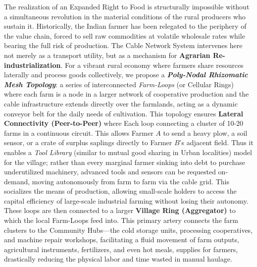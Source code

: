 The realization of an Expanded Right to Food is structurally impossible
without a simultaneous revolution in the material conditions of the
rural producers who sustain it. Historically, the Indian farmer has been
relegated to the periphery of the value chain, forced to sell raw
commodities at volatile wholesale rates while bearing the full risk of
production. The Cable Network System intervenes here not merely as a
transport utility, but as a mechanism for \textbf{Agrarian
Re-industrialization}. For a vibrant rural economy where farmers share
resources laterally and process goods collectively, we propose a
\textbf{\emph{Poly-Nodal Rhizomatic Mesh Topology}}: a series of
interconnected \emph{Farm-Loops} (or Cellular Rings) where each farm is
a node in a larger network of cooperative production and the cable
infrastructure extends directly over the farmlands, acting as a dynamic
conveyor belt for the daily needs of cultivation. This topology ensures
\textbf{Lateral Connectivity (Peer-to-Peer)} where Each loop connecting
a cluster of 10-20 farms in a continuous circuit. This allows Farmer
\(A\) to send a heavy plow, a soil sensor, or a crate of surplus
saplings directly to Farmer \(B\)'s adjacent field. Thus it enables a
\emph{Tool Library} (similar to mutual good sharing in Urban localities)
model for the village; rather than every marginal farmer sinking into
debt to purchase underutilized machinery, advanced tools and sensors can
be requested on-demand, moving autonomously from farm to farm via the
cable grid. This socializes the means of production, allowing
small-scale holders to access the capital efficiency of large-scale
industrial farming without losing their autonomy. These loops are then
connected to a larger \textbf{Village Ring (Aggregator)} to which the
local Farm-Loops feed into. This primary artery connects the farm
clusters to the Community Hubs---the cold storage units, processing
cooperatives, and machine repair workshops, facilitating a fluid
movement of farm outputs, agricultural instruments, fertilizers, and
even hot meals, supplies for farmers, drastically reducing the physical
labor and time wasted in manual haulage.

